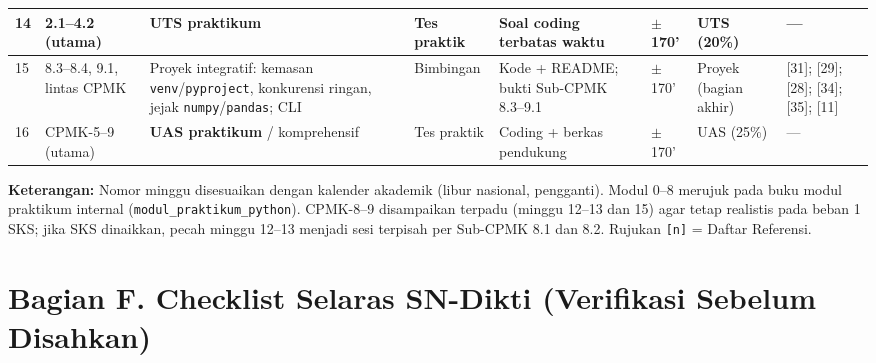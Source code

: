 \documentclass[12pt,a4paper]{article}
\begin{document}
{\begin{landscape}
\begin{longtable}{|p{0.55cm}|p{2.35cm}|p{2.5cm}|p{1.65cm}|p{2.55cm}|p{1.05cm}|p{1.75cm}|p{3.15cm}|}
\hline
14 & 2.1--4.2 (utama) & \textbf{UTS praktikum} & Tes praktik & Soal coding terbatas waktu & $\pm$170' & UTS (20\%) & --- \\
\hline
15 & 8.3--8.4, 9.1, lintas CPMK & Proyek integratif: kemasan \texttt{venv}/\texttt{pyproject}, konkurensi ringan, jejak \texttt{numpy}/\texttt{pandas}; CLI & Bimbingan & Kode + README; bukti Sub-CPMK 8.3--9.1 & $\pm$170' & Proyek (bagian akhir) & [31]; [29]; [28]; [34]; [35]; [11] \\
\hline
16 & CPMK-5--9 (utama) & \textbf{UAS praktikum} / komprehensif & Tes praktik & Coding + berkas pendukung & $\pm$170' & UAS (25\%) & --- \\
\hline
\end{longtable}
\end{landscape}
}

\vspace{0.5cm}

\noindent\textbf{Keterangan:} Nomor minggu disesuaikan dengan kalender akademik (libur nasional, pengganti). Modul 0--8 merujuk pada buku modul praktikum internal (\texttt{modul\_praktikum\_python}). CPMK-8--9 disampaikan terpadu (minggu 12--13 dan 15) agar tetap realistis pada beban 1 SKS; jika SKS dinaikkan, pecah minggu 12--13 menjadi sesi terpisah per Sub-CPMK 8.1 dan 8.2. Rujukan \texttt{[n]} = Daftar Referensi.

\vspace{0.75cm}

\section*{Bagian F. Checklist Selaras SN-Dikti (Verifikasi Sebelum Disahkan)}
\end{document}
